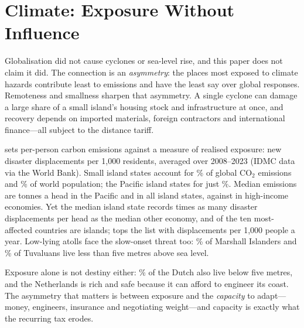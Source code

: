 \section{Climate: Exposure Without Influence}
\label{sec:climate}

Globalisation did not cause cyclones or sea-level rise, and this paper does
not claim it did. The connection is an \emph{asymmetry}: the places most
exposed to climate hazards contribute least to emissions and have the least
say over global responses. Remoteness and smallness sharpen that asymmetry.
A single cyclone can damage a large share of a small island's housing stock and
infrastructure at once, and recovery depends on imported materials, foreign
contractors and international finance---all subject to the distance tariff.



 sets per-person carbon emissions against a measure of
realised exposure: new disaster displacements per 1,000 residents, averaged
over 2008--2023 (IDMC data via the World Bank). Small island states account for \sidsCOshare\% of
global CO$_2$ emissions and \sidsPopShare\% of world population; the Pacific
island states for just \pacificCOshare\%. Median emissions are
\coPacificMedian{} tonnes a head in the Pacific and \coSIDSMedian{} in all
island states, against \coHICMedian{} in high-income economies. Yet the
median island state records \dispSIDSRatio{} times as many disaster
displacements per head as the median other economy, and \nDispTopTenSIDS{}
of the ten most-affected countries are islands; \dispTopName{} tops the list
with \dispTopValue{} displacements per 1,000 people a year. Low-lying atolls
face the slow-onset threat too: \lowElevMarshall\% of Marshall Islanders and
\lowElevTuvalu\% of Tuvaluans live less than five metres above sea level.

Exposure alone is not destiny either: \lowElevNetherlands\% of the Dutch also
live below five metres, and the Netherlands is rich and safe because it can
afford to engineer its coast. The asymmetry that matters is between exposure
and the \emph{capacity} to adapt---money, engineers, insurance and
negotiating weight---and capacity is exactly what the recurring tax erodes.
